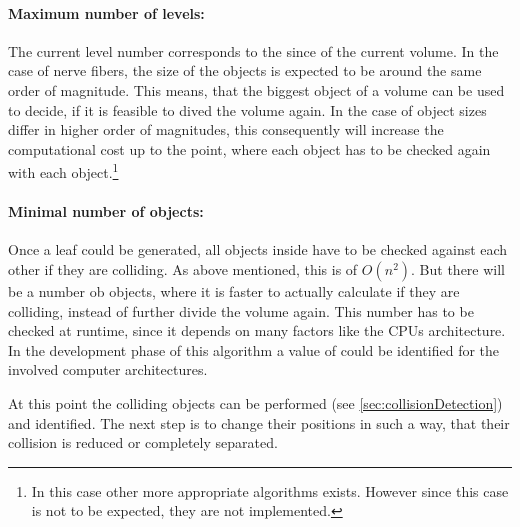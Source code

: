 \paragraph{Maximum number of levels:}
The current level number corresponds to the since of the current volume.
In the case of nerve fibers, the size of the objects is expected to be around the same order of magnitude.
This means, that the biggest object of a volume can be used to decide, if it is feasible to dived the volume again.
In the case of object sizes differ in higher order of magnitudes, this consequently will increase the computational cost up to the point, where each object has to be checked again with each object.\footnote{In this case other more appropriate algorithms exists. However since this case is not to be expected, they are not implemented.}
%
\paragraph{Minimal number of objects:}
Once a leaf could be generated, all objects inside have to be checked against each other if they are colliding.
As above mentioned, this is of $O(n^2)$.
But there will be a number ob objects, where it is faster to actually calculate if they are colliding, instead of further divide the volume again.
This number has to be checked at runtime, since it depends on many factors like the CPUs architecture.
In the development phase of this algorithm a value of  could be identified for the involved computer architectures.
\par
%
At this point the colliding objects can be performed (see \cref{sec:collisionDetection}) and identified.
The next step is to change their positions in such a way, that their collision is reduced or completely separated.
%
